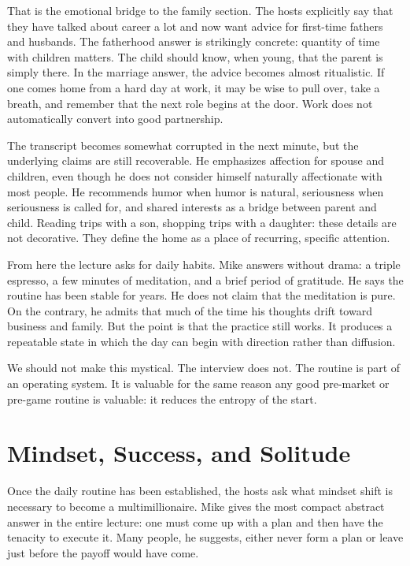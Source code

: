 That is the emotional bridge to the family section. The hosts explicitly say that they have talked about career a lot and now want advice for first-time fathers and husbands. The fatherhood answer is strikingly concrete: quantity of time with children matters. The child should know, when young, that the parent is simply there. In the marriage answer, the advice becomes almost ritualistic. If one comes home from a hard day at work, it may be wise to pull over, take a breath, and remember that the next role begins at the door. Work does not automatically convert into good partnership.

The transcript becomes somewhat corrupted in the next minute, but the underlying claims are still recoverable. He emphasizes affection for spouse and children, even though he does not consider himself naturally affectionate with most people. He recommends humor when humor is natural, seriousness when seriousness is called for, and shared interests as a bridge between parent and child. Reading trips with a son, shopping trips with a daughter: these details are not decorative. They define the home as a place of recurring, specific attention.

From here the lecture asks for daily habits. Mike answers without drama: a triple espresso, a few minutes of meditation, and a brief period of gratitude. He says the routine has been stable for years. He does not claim that the meditation is pure. On the contrary, he admits that much of the time his thoughts drift toward business and family. But the point is that the practice still works. It produces a repeatable state in which the day can begin with direction rather than diffusion.

We should not make this mystical. The interview does not. The routine is part of an operating system. It is valuable for the same reason any good pre-market or pre-game routine is valuable: it reduces the entropy of the start.

\section{Mindset, Success, and Solitude}

Once the daily routine has been established, the hosts ask what mindset shift is necessary to become a multimillionaire. Mike gives the most compact abstract answer in the entire lecture: one must come up with a plan and then have the tenacity to execute it. Many people, he suggests, either never form a plan or leave just before the payoff would have come.

